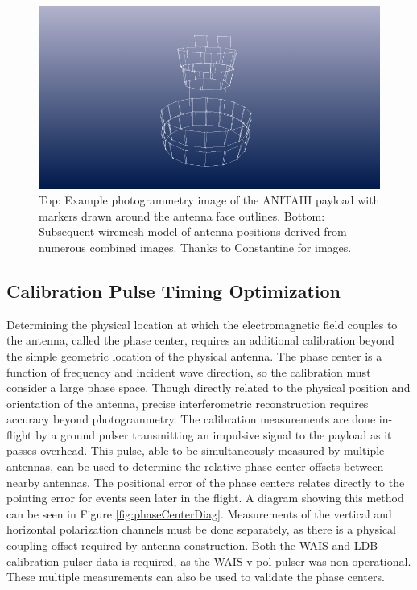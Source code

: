 \begin{figure}
		\includegraphics[width=\textwidth]{figures/KBelovANITA-III_photogrammetry_update-4}
		\caption{Top: Example photogrammetry image of the ANITAIII payload with markers drawn around the antenna face outlines.  Bottom: Subsequent wiremesh model of antenna positions derived from numerous combined images.  Thanks to Constantine for images.}
	\end{figure}
	
		
	\subsection{Calibration Pulse Timing Optimization}
		Determining the physical location at which the electromagnetic field couples to the antenna, called the phase center, requires an additional calibration beyond the simple geometric location of the physical antenna.  The phase center is a function of frequency and incident wave direction, so the calibration must consider a large phase space. Though directly related to the physical position and orientation of the antenna, precise interferometric reconstruction requires accuracy beyond photogrammetry. The calibration measurements are done in-flight by a ground pulser transmitting an impulsive signal to the payload as it passes overhead.  This pulse, able to be simultaneously measured by multiple antennas, can be used to determine the relative phase center offsets between nearby antennas.  The positional error of the phase centers relates directly to the pointing error for events seen later in the flight.  A diagram showing this method can be seen in Figure \ref{fig:phaseCenterDiag}.  Measurements of the vertical and horizontal polarization channels must be done separately, as there is a physical coupling offset required by antenna construction.  Both the WAIS and LDB calibration pulser data is required, as the WAIS v-pol pulser was non-operational.  These multiple measurements can also be used to validate the phase centers.
		
